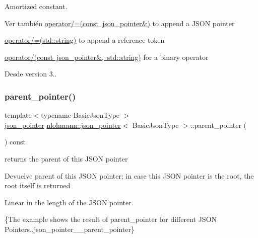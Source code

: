 Amortized constant.

\begin{DoxySeeAlso}{Ver también}
\mbox{\hyperlink{classnlohmann_1_1json__pointer_a7395bd0af29ac23fd3f21543c935cdfa}{operator/=(const json\+\_\+pointer\&)}} to append a J\+S\+ON pointer 

\mbox{\hyperlink{classnlohmann_1_1json__pointer_abdd21567b2b1d69329af0f520335e68b}{operator/=(std\+::string)}} to append a reference token 

\mbox{\hyperlink{classnlohmann_1_1json__pointer_a926c9065dbed1bedc17857a813f7a46f}{operator/(const json\+\_\+pointer\&, std\+::string)}} for a binary operator
\end{DoxySeeAlso}
\begin{DoxySince}{Desde}
version 3.. 
\end{DoxySince}
\mbox{\label{classnlohmann_1_1json__pointer_afdaacce1edb7145e0434e014f0e8685a}} 
\subsubsection{\texorpdfstring{parent\+\_\+pointer()}{parent\_pointer()}}
{\footnotesize\ttfamily template$<$typename Basic\+Json\+Type $>$ \\
\mbox{\hyperlink{classnlohmann_1_1json__pointer}{json\+\_\+pointer}} \mbox{\hyperlink{classnlohmann_1_1json__pointer}{nlohmann\+::json\+\_\+pointer}}$<$ Basic\+Json\+Type $>$\+::parent\+\_\+pointer (\begin{DoxyParamCaption}{ }\end{DoxyParamCaption}) const\hspace{0.3cm}{\ttfamily [inline]}}



returns the parent of this J\+S\+ON pointer 

\begin{DoxyReturn}{Devuelve}
parent of this J\+S\+ON pointer; in case this J\+S\+ON pointer is the root, the root itself is returned
\end{DoxyReturn}
Linear in the length of the J\+S\+ON pointer.

\{The example shows the result of {\ttfamily parent\+\_\+pointer} for different J\+S\+ON Pointers.,json\+\_\+pointer\+\_\+\+\_\+parent\+\_\+pointer\}

